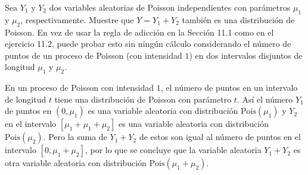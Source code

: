 \question

	 Sea $Y_1$ y $Y_2$ dos variables aleatorias de Poisson independientes con parámetros $\mu_1$ y $\mu_2$, respectivamente. Muestre que $Y=Y_1+Y_2$ también es una distribución de Poisson. En vez de usar la regla de adicción en la Sección 11.1 como en el ejercicio 11.2, puede probar esto sin ningún cálculo considerando el número de puntos de un proceso de Poisson (con intensidad $1$) en dos intervalos disjuntos de longitud $\mu_1$ y $\mu_2$.

	\begin{solutionordottedlines}
		En un proceso de Poisson con intensidad $1$, el número de puntos en un intervalo de longitud $t$ tiene una distribución de Poisson con parámetro $t$. Así el número $Y_{1}$ de puntos en $\left(0,\mu_1\right)$ es una variable aleatoria con distribución $\mathrm{Pois}\left(\mu_1\right)$ y $Y_{2}$ en el intervalo $\left[\mu_1+\mu_1+\mu_2\right]$ es una variable aleatoria con distribución $\mathrm{Pois}\left(\mu_2\right)$. Pero la suma de $Y_{1}+Y_{2}$ de estos son igual al número de puntos en el intervalo $\left[0,\mu_1+\mu_2\right]$, por lo que se concluye que la variable aleatoria $Y_{1}+Y_{2}$ es otra variable aleatoria con distribución $\mathrm{Pois}\left(\mu_1+\mu_2\right)$.
	\end{solutionordottedlines}